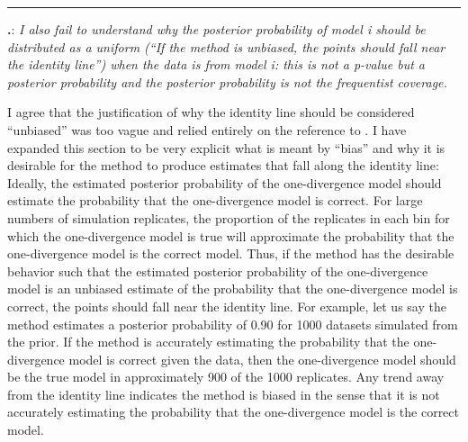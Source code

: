 \documentclass[12pt]{article}
\newcounter{commentCounter}
\newcommand{\revcomment}[1]{{\addtocounter{commentCounter}{1}}
    \medskip \hrule \noindent
\textbf{\arabic{section}.\arabic{commentCounter}}: {\sl #1}\par\xspace}
\newcommand{\response}[1]{{\addtolength{\leftskip}{0.25in} #1\par}\xspace}
\let\quoteOld\quote
\let\endquoteOld\endquote
\renewenvironment{quote}{\sffamily\small\quoteOld}{\endquoteOld}
\begin{document}
\revcomment{
    I also fail to understand why the posterior probability of model i should
    be distributed as a uniform (``If the method is unbiased, the points should
    fall near the identity line'') when the data is from model i: this is not a
    p-value but a posterior probability and the posterior probability is not
    the frequentist coverage.
}
\response{
    I agree that the justification of why the identity line should be
    considered ``unbiased'' was too vague and relied entirely on the reference
    to \cite{Huelsenbeck2004}. I have expanded this section to be very explicit
    what is meant by ``bias'' and why it is desirable for the method to produce
    estimates that fall along the identity line:
    \begin{quote}
        Ideally, the estimated posterior probability of the one-divergence
        model should estimate the probability that the one-divergence model is
        correct.  For large numbers of simulation replicates, the proportion of
        the replicates in each bin for which the one-divergence model is true
        will approximate the probability that the one-divergence model is the
        correct model.  Thus, if the method has the desirable behavior such
        that the estimated posterior probability of the one-divergence model is
        an unbiased estimate of the probability that the one-divergence model
        is correct, the points should fall near the identity line.  For
        example, let us say the method estimates a posterior probability of
        0.90 for 1000 datasets simulated from the prior.  If the method is
        accurately estimating the probability that the one-divergence model is
        correct given the data, then the one-divergence model should be the
        true model in approximately 900 of the 1000 replicates.  Any trend away
        from the identity line indicates the method is biased in the sense that
        it is not accurately estimating the probability that the one-divergence
        model is the correct model.
    \end{quote}
}
\end{document}
